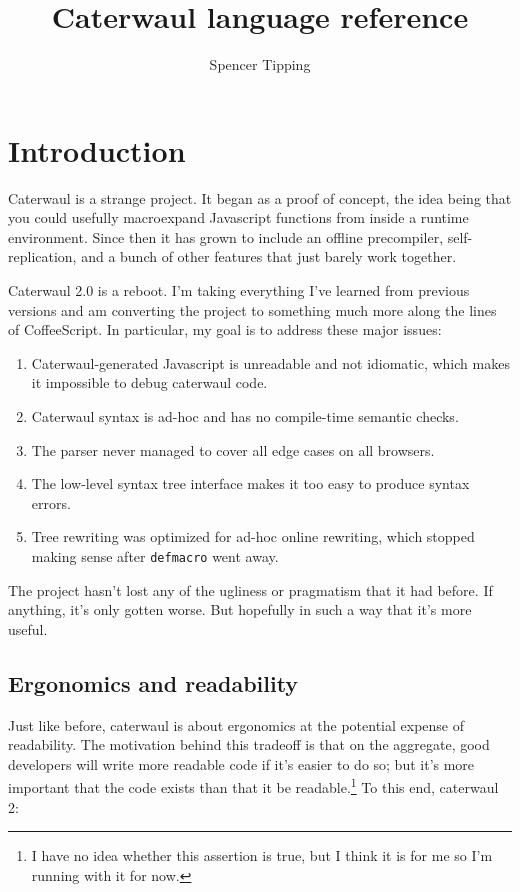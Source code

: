 \documentclass{report}
\title{Caterwaul language reference}
\author{Spencer Tipping}
\begin{document}
\maketitle{}
\tableofcontents{}

\chapter{Introduction}
  Caterwaul is a strange project. It began as a proof of concept, the idea being that you could usefully macroexpand Javascript functions from inside a runtime environment. Since then it has
  grown to include an offline precompiler, self-replication, and a bunch of other features that just barely work together.

  Caterwaul 2.0 is a reboot. I'm taking everything I've learned from previous versions and am converting the project to something much more along the lines of CoffeeScript. In particular, my
  goal is to address these major issues:

\begin{enumerate}
\item{Caterwaul-generated Javascript is unreadable and not idiomatic, which makes it impossible to debug caterwaul code.}
\item{Caterwaul syntax is ad-hoc and has no compile-time semantic checks.}
\item{The parser never managed to cover all edge cases on all browsers.}
\item{The low-level syntax tree interface makes it too easy to produce syntax errors.}
\item{Tree rewriting was optimized for ad-hoc online rewriting, which stopped making sense after {\tt defmacro} went away.}
\end{enumerate}

  The project hasn't lost any of the ugliness or pragmatism that it had before. If anything, it's only gotten worse. But hopefully in such a way that it's more useful.

\section{Ergonomics and readability}
    Just like before, caterwaul is about ergonomics at the potential expense of readability. The motivation behind this tradeoff is that on the aggregate, good developers will write more
    readable code if it's easier to do so; but it's more important that the code exists than that it be readable.\footnote{I have no idea whether this assertion is true, but I think it is for
    me so I'm running with it for now.} To this end, caterwaul 2:
\end{document}
